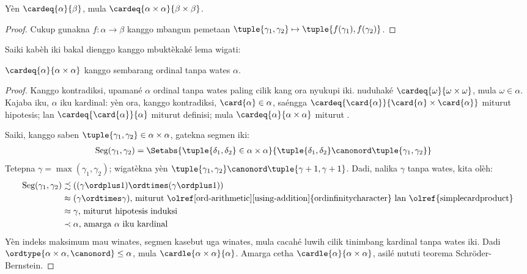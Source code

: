 \documentclass[../../../include/open-logic-section]{subfiles}
\begin{document}
\begin{prop}
Yèn $\cardeq{\alpha}{\beta}$, mula $\cardeq{\alpha \times \alpha}{\beta
\times \beta}$.
\end{prop}

\begin{proof}
Cukup gunakna $f \colon \alpha \to \beta$ kanggo mbangun
pemetaan $\tuple{\gamma_1,
\gamma_2} \mapsto \tuple{f(\gamma_1), f(\gamma_2)}$.
\end{proof}
\noindent
Saiki kabèh iki bakal dienggo kanggo mbuktèkaké lema wigati:
\begin{lem}
$\cardeq{\alpha}{\alpha \times \alpha}$ kanggo sembarang
ordinal tanpa wates $\alpha$.
\end{lem}

\begin{proof}
Kanggo kontradiksi, upamané $\alpha$ ordinal tanpa wates paling
cilik kang ora nyukupi iki.
 nuduhaké
$\cardeq{\omega}{\omega\times\omega}$, mula $\omega \in \alpha$.
Kajaba iku, $\alpha$ iku kardinal: yèn ora, kanggo
kontradiksi, $\card{\alpha} \in \alpha$, saéngga
$\cardeq{\card{\alpha}}{\card{\alpha} \times \card{\alpha}}$ miturut
hipotesis; lan $\cardeq{\card{\alpha}}{\alpha}$ miturut
definisi; mula $\cardeq{\alpha}{\alpha\times\alpha}$ miturut
.

Saiki, kanggo saben $\tuple{\gamma_1, \gamma_2} \in \alpha \times \alpha$,
gatekna segmen iki:
\begin{align*}
	\text{Seg}(\gamma_1, \gamma_2) &= \Setabs{\tuple{\delta_1, \delta_2} \in \alpha \times \alpha}{\tuple{\delta_1, \delta_2} \canonord \tuple{\gamma_1, \gamma_2}}
\end{align*}
Tetepna $\gamma = \max(\gamma_1, \gamma_2)$; wigatèkna yèn $\tuple{\gamma_1, \gamma_2} \canonord \tuple{\gamma+1, \gamma + 1}$. Dadi, nalika $\gamma$ tanpa wates, kita olèh:
\begin{align*}
	\text{Seg}(\gamma_1, \gamma_2) &
	\precsim ((\gamma \ordplus 1)\ordtimes (\gamma \ordplus 1))\\
	&\approx (\gamma \ordtimes \gamma)
	\text{, miturut \olref[ord-arithmetic][using-addition]{ordinfinitycharacter} lan
	\olref{simplecardproduct}}\\
	&\approx \gamma \text{, miturut hipotesis induksi}\\
	& \prec \alpha\text{, amarga $\alpha$ iku kardinal}
\end{align*}
Yèn indeks maksimum mau winates, segmen kasebut uga winates, mula cacahé
luwih cilik tinimbang kardinal tanpa wates iki. Dadi
$\ordtype{\alpha\times \alpha, \canonord} \leq \alpha$, mula
$\cardle{\alpha \times \alpha}{\alpha}$. Amarga cetha
$\cardle{\alpha}{\alpha \times \alpha}$, asilé nututi
teorema Schr\"oder-Bernstein.
\end{proof}
\end{document}
